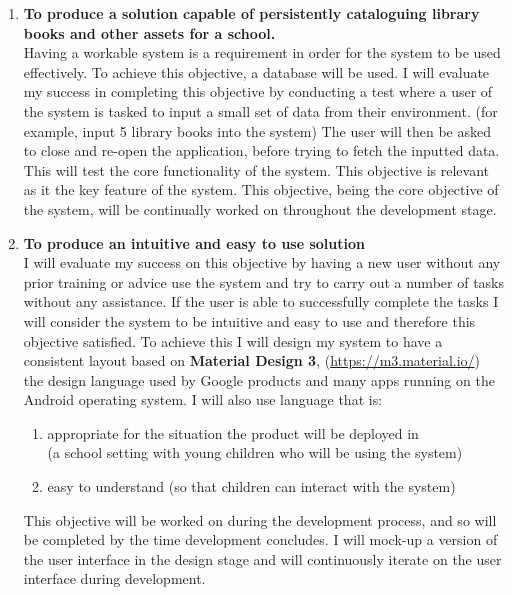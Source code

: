 \documentclass[../../../main.tex]{subfiles}
\begin{document}
\begin{enumerate}
  \item \textbf{To produce a solution capable of persistently cataloguing library books and other assets for a school.}\\
        Having a workable system is a requirement in order for the system to be used effectively.
        To achieve this objective, a database will be used.
        I will evaluate my success in completing this objective by conducting a test where a user of the system is
        tasked to input a small set of data from their environment. (for example, input 5 library books into the system)
        The user will then be asked to close and re-open the application, before trying to fetch the inputted data.
        This will test the core functionality of the system. This objective is relevant as it the key feature of the system.
        This objective, being the core objective of the system, will be continually worked on throughout the development stage.

  \item \textbf{To produce an intuitive and easy to use solution}\\
        I will evaluate my success on this objective by having a new user without any prior training or advice use the system and
        try to carry out a number of tasks without any assistance. If the user is able to successfully complete the tasks
        I will consider the system to be intuitive and easy to use and therefore this objective satisfied.
        To achieve this I will design my system to have a consistent layout based on \textbf{Material Design 3}, (\url{https://m3.material.io/})
        the design language used by Google products and many apps running on the Android operating system.
        I will also use language that is:
        \begin{enumerate}
          \item appropriate for the situation the product will be deployed in\\(a school setting with young children who will be using the system)
          \item easy to understand (so that children can interact with the system)
        \end{enumerate}

        This objective will be worked on during the development process, and so will be
        completed by the time development concludes. I will mock-up a version of the
        user interface in the design stage and will continuously iterate on the
        user interface during development.


\end{enumerate}
\end{document}

